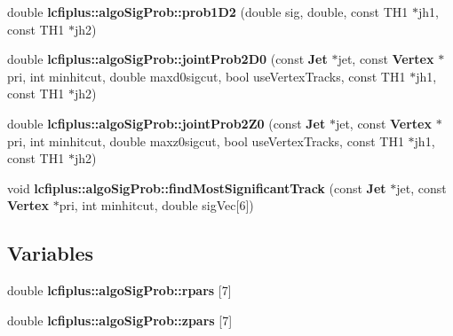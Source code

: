 \begin{DoxyCompactItemize}
\item 
double {\bf lcfiplus\-::algo\-Sig\-Prob\-::prob1\-D2} (double sig, double, const T\-H1 $\ast$jh1, const T\-H1 $\ast$jh2)
\item 
double {\bf lcfiplus\-::algo\-Sig\-Prob\-::joint\-Prob2\-D0} (const {\bf Jet} $\ast$jet, const {\bf Vertex} $\ast$pri, int minhitcut, double maxd0sigcut, bool use\-Vertex\-Tracks, const T\-H1 $\ast$jh1, const T\-H1 $\ast$jh2)
\item 
double {\bf lcfiplus\-::algo\-Sig\-Prob\-::joint\-Prob2\-Z0} (const {\bf Jet} $\ast$jet, const {\bf Vertex} $\ast$pri, int minhitcut, double maxz0sigcut, bool use\-Vertex\-Tracks, const T\-H1 $\ast$jh1, const T\-H1 $\ast$jh2)
\item 
void {\bf lcfiplus\-::algo\-Sig\-Prob\-::find\-Most\-Significant\-Track} (const {\bf Jet} $\ast$jet, const {\bf Vertex} $\ast$pri, int minhitcut, double sig\-Vec[6])
\end{DoxyCompactItemize}
\subsection*{Variables}
\begin{DoxyCompactItemize}
\item 
double {\bf lcfiplus\-::algo\-Sig\-Prob\-::rpars} [7]
\item 
double {\bf lcfiplus\-::algo\-Sig\-Prob\-::zpars} [7]
\end{DoxyCompactItemize}
